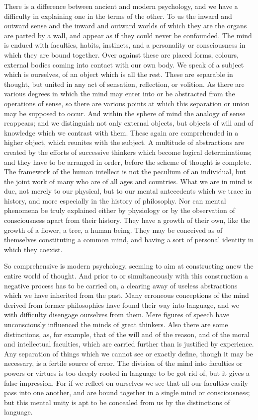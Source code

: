 There is a difference between ancient and modern psychology, and we
have a difficulty in explaining one in the terms of the other. To us the
inward and outward sense and the inward and outward worlds of which they
are the organs are parted by a wall, and appear as if they could never
be confounded. The mind is endued with faculties, habits, instincts, and
a personality or consciousness in which they are bound together. Over
against these are placed forms, colours, external bodies coming into
contact with our own body. We speak of a subject which is ourselves,
of an object which is all the rest. These are separable in thought, but
united in any act of sensation, reflection, or volition. As there are
various degrees in which the mind may enter into or be abstracted from
the operations of sense, so there are various points at which this
separation or union may be supposed to occur. And within the sphere
of mind the analogy of sense reappears; and we distinguish not only
external objects, but objects of will and of knowledge which we contrast
with them. These again are comprehended in a higher object, which
reunites with the subject. A multitude of abstractions are created by
the efforts of successive thinkers which become logical determinations;
and they have to be arranged in order, before the scheme of thought is
complete. The framework of the human intellect is not the peculium of
an individual, but the joint work of many who are of all ages and
countries. What we are in mind is due, not merely to our physical, but
to our mental antecedents which we trace in history, and more especially
in the history of philosophy. Nor can mental phenomena be truly
explained either by physiology or by the observation of consciousness
apart from their history. They have a growth of their own, like the
growth of a flower, a tree, a human being. They may be conceived as of
themselves constituting a common mind, and having a sort of personal
identity in which they coexist.

So comprehensive is modern psychology, seeming to aim at constructing
anew the entire world of thought. And prior to or simultaneously with
this construction a negative process has to be carried on, a clearing
away of useless abstractions which we have inherited from the past. Many
erroneous conceptions of the mind derived from former philosophies
have found their way into language, and we with difficulty disengage
ourselves from them. Mere figures of speech have unconsciously
influenced the minds of great thinkers. Also there are some
distinctions, as, for example, that of the will and of the reason, and
of the moral and intellectual faculties, which are carried further than
is justified by experience. Any separation of things which we cannot see
or exactly define, though it may be necessary, is a fertile source of
error. The division of the mind into faculties or powers or virtues is
too deeply rooted in language to be got rid of, but it gives a false
impression. For if we reflect on ourselves we see that all our faculties
easily pass into one another, and are bound together in a single mind or
consciousness; but this mental unity is apt to be concealed from us by
the distinctions of language.

